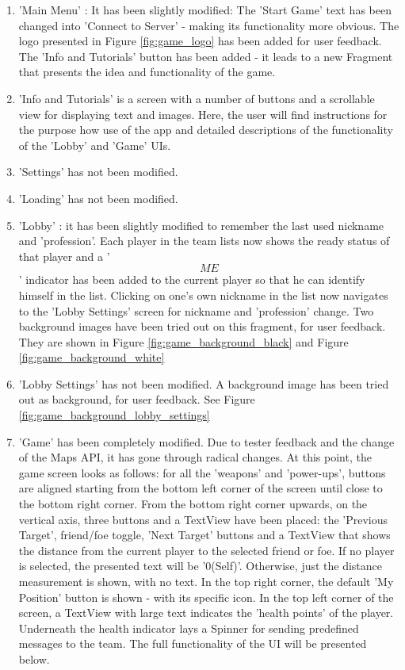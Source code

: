 \begin{enumerate}
  \item 'Main Menu' : It has been slightly modified: The 'Start Game' text has
  been changed into 'Connect to Server' - making its functionality more
  obvious. The logo presented in Figure \ref{fig:game_logo} has been added for
  user feedback. The 'Info and Tutorials' button has been added - it leads to
  a new Fragment that presents the idea and functionality of the game.
  
  \item 'Info and Tutorials' is a screen with a number of buttons and a
  scrollable view for displaying text and images. Here, the user will find
  instructions for the purpose how use of the app and detailed descriptions of
  the functionality of the 'Lobby' and 'Game' UIs.
  
  \item 'Settings' has not been modified.
  
  \item 'Loading' has not been modified.
  
  \item 'Lobby' : it has been slightly modified to remember the last used
  nickname and 'profession'. Each player in the team lists now shows the ready
  status of that player and a '\[ME\]' indicator has been added to the current
  player so that he can identify himself in the list. Clicking on one's own
  nickname in the list now navigates to the 'Lobby Settings' screen for
  nickname and 'profession' change. Two background images have been tried out on
  this fragment, for user feedback. They are shown in Figure
  \ref{fig:game_background_black} and Figure \ref{fig:game_background_white} 
  
  \item 'Lobby Settings' has not been modified. A background image has been
  tried out as background, for user feedback. See Figure
  \ref{fig:game_background_lobby_settings}
  
  \item 'Game' has been completely modified. Due to tester feedback and
  the change of the Maps API, it has gone through radical changes. At this
  point, the game screen looks as follows: for all the 'weapons' and
  'power-ups', buttons are aligned starting from the bottom left corner of the screen until
  close to the bottom right corner. From the bottom right corner upwards, on
  the vertical axis, three buttons and a TextView have been placed: the
  'Previous Target', friend/foe toggle, 'Next Target' buttons and a TextView
  that shows the distance from the current player to the selected friend or
  foe. If no player is selected, the presented text will be '0(Self)'.
  Otherwise, just the distance measurement is shown, with no text. In the top
  right corner, the default 'My Position' button is shown - with its specific
  icon. In the top left corner of the screen, a TextView with large text
  indicates the 'health points' of the player. Underneath the health indicator
  lays a Spinner for sending predefined messages to the team. The full
  functionality of the UI will be presented below.
  
\end{enumerate}

